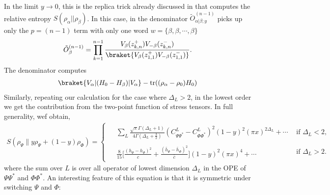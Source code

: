 \documentclass[11pt]{article}
\newcommand{\tr}{\mathrm{tr}}
\newcommand{\lb}{\left(}
\newcommand{\rb}{\right)}
\begin{document}
In the limit $y\to 0$, this is the replica trick already discussed in \cite{Lashkari_2014} that computes the relative entropy $S(\rho_\alpha||\rho_\beta)$. In this case, in the denominator $\tilde{O}_{\alpha|\beta;y}^{(n-1)}$ picks up only the $p=(n-1)$ term with only one word $w=\{\beta,\beta,\cdots, \beta\}$
\begin{align}
  \tilde{O}_\beta^{(n-1)} = \prod_{k=1}^{n-1}\frac{V_{\beta}(z_{k,n}^{+})V_{-\beta}(z_{k,n}^{-})}{\braket{V_{\beta}(z^+_{1,1})V_{-\beta}(z^-_{1,1})}}.
\end{align}
The denominator computes 
\begin{align}
\braket{V_\alpha|(H_0-H_\beta)|V_\alpha}-\tr((\rho_\alpha-\rho_0)H_0)
\end{align}
Similarly, repeating our calculation for the case where $\Delta_L>2$, in the lowest order we get the contribution from the two-point function of stress tensors. In full generality, wef obtain, 
\begin{align}\label{smallxMixture}
\boxed{
S(\rho_\Psi\|y\rho_\Psi+(1-y)\rho_\Phi)
=
\begin{cases}
\begin{aligned}
&\sum_L\frac{\sqrt{\pi}\Gamma(\Delta_L+1)}
{4\Gamma(\Delta_L+\frac32)}
(C^L_{\Psi\Psi^*}-C^L_{\Phi\Phi^*})^2
(1-y)^2(\pi x)^{2\Delta_L}
+\cdots
\end{aligned}
&
\text{if }\Delta_L< 2,
\\[2ex]
\begin{aligned}
&\frac{8}{15}
\Bigg[
\frac{(h_\Psi-h_\Phi)^2}{c} 
+\frac{(\bar h_\Psi-\bar h_\Phi)^2}{\bar c}
\Bigg]
(1-y)^2(\pi x)^4
+\cdots
\end{aligned}
&
\text{if }\Delta_L>2 .
\end{cases}
}
\end{align}
where the sum over $L$ is over all operator of lowest dimension $\Delta_L$ in the OPE of $\Psi\Psi^*$ and $\Phi \Phi^*$.
An interesting feature of this equation is that it is symmetric under switching $\Psi$ and $\Phi$:
\end{document}
